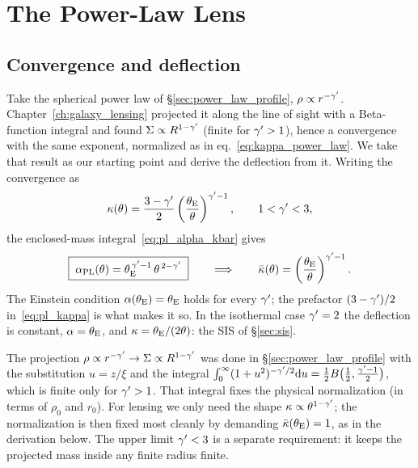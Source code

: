 \section{The Power-Law Lens}
\label{sec:pl_powerlaw}

\subsection{Convergence and deflection}

Take the spherical power law of \S\ref{sec:power_law_profile},
$\rho\propto r^{-\gamma'}$.  Chapter~\ref{ch:galaxy_lensing} projected it
along the line of sight with a Beta-function integral and found
$\Sigma\propto R^{1-\gamma'}$ (finite for $\gamma'>1$), hence a convergence
with the same exponent, normalized as in
eq.~\eqref{eq:kappa_power_law}.  We take that result as our starting
point and derive the deflection from it.  Writing the convergence as
\begin{equation}
    \kappa(\theta)=\frac{3-\gamma'}{2}\left(\frac{\theta_{\mathrm{E}}}{\theta}\right)^{\gamma'-1} ,
    \qquad 1<\gamma'<3 ,
    \label{eq:pl_kappa}
\end{equation}
the enclosed-mass integral~\eqref{eq:pl_alpha_kbar} gives
\begin{equation}
    \boxed{\;\alpha_{\rm PL}(\theta)=\theta_{\mathrm{E}}^{\,\gamma'-1}\,\theta^{\,2-\gamma'}\;}
    \qquad\Longrightarrow\qquad
    \bar\kappa(\theta)=\left(\frac{\theta_{\mathrm{E}}}{\theta}\right)^{\gamma'-1} .
    \label{eq:pl_alpha}
\end{equation}
The Einstein condition $\alpha(\theta_{\mathrm{E}})=\theta_{\mathrm{E}}$ holds for every
$\gamma'$; the prefactor $(3-\gamma')/2$ in~\eqref{eq:pl_kappa} is what
makes it so.  In the isothermal case $\gamma'=2$ the deflection is
constant, $\alpha=\theta_{\mathrm{E}}$, and $\kappa=\theta_{\mathrm{E}}/(2\theta)$: the SIS of
\S\ref{sec:sis}.

\begin{bridge}
The projection $\rho\propto r^{-\gamma'}\to\Sigma\propto R^{1-\gamma'}$ was
done in \S\ref{sec:power_law_profile} with the substitution $u=z/\xi$
and the integral
$\int_0^\infty(1+u^2)^{-\gamma'/2}\dd u=\tfrac12 B\big(\tfrac12,\tfrac{\gamma'-1}{2}\big)$,
which is finite only for $\gamma'>1$.  That integral fixes the
physical normalization (in terms of $\rho_0$ and $r_0$).  For
lensing we only need the shape $\kappa\propto\theta^{1-\gamma'}$; the
normalization is then fixed most cleanly by demanding
$\bar\kappa(\theta_{\mathrm{E}})=1$, as in the derivation below.  The upper limit
$\gamma'<3$ is a separate requirement: it keeps the projected mass inside
any finite radius finite.
\end{bridge}


